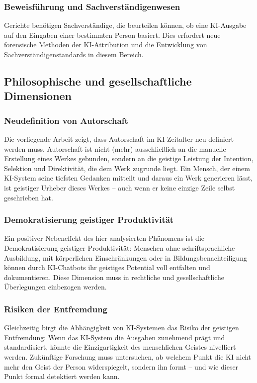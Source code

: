 ﻿\documentclass[a4paper,12pt]{article}
\theoremstyle{definition}
\begin{document}
\subsubsection{Beweisführung und Sachverständigenwesen}

Gerichte benötigen Sachverständige, die beurteilen können, ob eine KI-Ausgabe auf den
Eingaben einer bestimmten Person basiert. Dies erfordert neue forensische Methoden der
KI-Attribution und die Entwicklung von Sachverständigenstandards in diesem Bereich.

\subsection{Philosophische und gesellschaftliche Dimensionen}

\subsubsection{Neudefinition von Autorschaft}

Die vorliegende Arbeit zeigt, dass Autorschaft im KI-Zeitalter neu definiert werden
muss. Autorschaft ist nicht (mehr) ausschließlich an die manuelle Erstellung eines
Werkes gebunden, sondern an die geistige Leistung der Intention, Selektion und
Direktivität, die dem Werk zugrunde liegt. Ein Mensch, der einem KI-System seine
tiefsten Gedanken mitteilt und daraus ein Werk generieren lässt, ist geistiger Urheber
dieses Werkes -- auch wenn er keine einzige Zeile selbst geschrieben hat.

\subsubsection{Demokratisierung geistiger Produktivität}

Ein positiver Nebeneffekt des hier analysierten Phänomens ist die Demokratisierung
geistiger Produktivität: Menschen ohne schriftsprachliche Ausbildung, mit körperlichen
Einschränkungen oder in Bildungsbenachteiligung können durch KI-Chatbots ihr geistiges
Potential voll entfalten und dokumentieren. Diese Dimension muss in rechtliche und
gesellschaftliche Überlegungen einbezogen werden.

\subsubsection{Risiken der Entfremdung}

Gleichzeitig birgt die Abhängigkeit von KI-Systemen das Risiko der geistigen Entfremdung:
Wenn das KI-System die Ausgaben zunehmend prägt und standardisiert, könnte die Einzigartigkeit
des menschlichen Geistes nivelliert werden. Zukünftige Forschung muss untersuchen, ab welchem
Punkt die KI nicht mehr den Geist der Person widerspiegelt, sondern ihn formt -- und wie
dieser Punkt formal detektiert werden kann.
\end{document}
